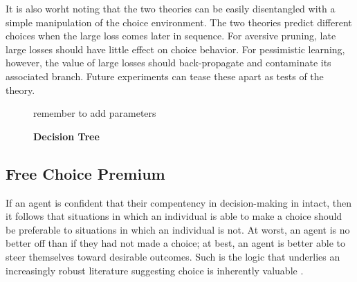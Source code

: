 \documentclass[11pt]{article} %
\begin{document}
It is also worht noting that the two theories can be easily disentangled with a
simple manipulation of the choice environment. The two theories predict
different choices when the large loss comes later in sequence. For aversive pruning,
late large losses should have little effect on choice behavior. For pessimistic
learning, however, the value of large losses should back-propagate and contaminate
its associated branch. Future experiments can tease these apart as tests of the theory.

\begin{figure}
  \centerline{%
  }
  \caption{\textbf{Decision Tree}}
  \par remember to add parameters
\end{figure}

\subsection{Free Choice Premium}

If an agent is confident that their compentency in decision-making in intact,
then it follows that situations in which an individual is able to make a choice
should be preferable to situations in which an individual is not. At worst,
an agent is no better off than if they had not made a choice; at best, an agent
is better able to steer themselves toward desirable outcomes. Such is the logic
that underlies an increasingly robust literature suggesting choice is inherently
valuable \citep{Leotti2010}.
\end{document}
